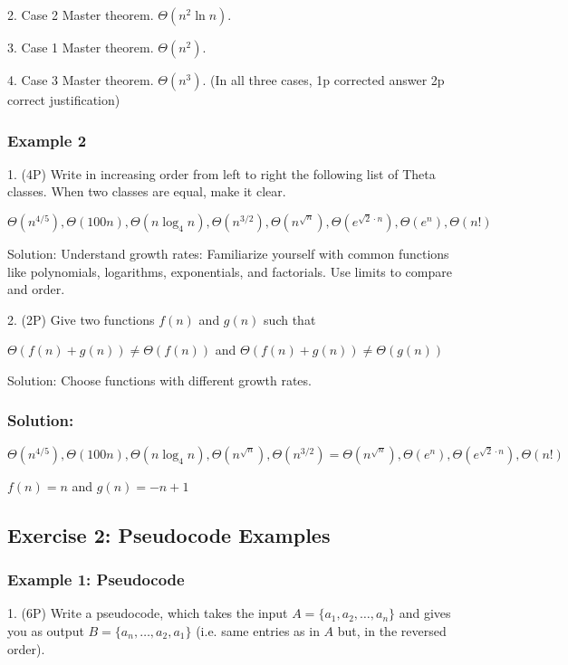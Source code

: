 2. Case 2 Master theorem. \(\Theta(n^2 \ln n)\).

3. Case 1 Master theorem. \(\Theta(n^2)\).

4. Case 3 Master theorem. \(\Theta(n^3)\). (In all three cases, 1p corrected answer 2p correct justification)

\subsubsection*{Example 2}
1. (4P) Write in increasing order from left to right the following list of Theta classes. When two classes are equal, make it clear.

\(\Theta(n^{4/5}), \Theta(100n), \Theta(n \log_4 n), \Theta(n^{3/2}), \Theta(n^{\sqrt{n}}), \Theta(e^{\sqrt{2} \cdot n}), \Theta(e^n), \Theta(n!)\)

Solution: Understand growth rates: Familiarize yourself with common functions like polynomials, logarithms, exponentials, and factorials. Use limits to compare and order.

2. (2P) Give two functions \(f(n)\) and \(g(n)\) such that

\(\Theta(f(n) + g(n)) \neq \Theta(f(n))\) and \(\Theta(f(n) + g(n)) \neq \Theta(g(n))\)

Solution: Choose functions with different growth rates.

\subsubsection*{Solution:}
\(\Theta(n^{4/5}), \Theta(100n), \Theta(n \log_4 n), \Theta(n^{\sqrt{n}}), \Theta(n^{3/2}) = \Theta(n^{\sqrt{n}}), \Theta(e^n), \Theta(e^{\sqrt{2} \cdot n}), \Theta(n!)\)

\(f(n) = n\) and \(g(n) = -n + 1\)

\subsection*{Exercise 2: Pseudocode Examples}

\subsubsection*{Example 1: Pseudocode}

1. (6P) Write a pseudocode, which takes the input $A = \{a_1,a_2,\ldots,a_n\}$ and gives you as output $B = \{a_n,\ldots,a_2,a_1\}$ (i.e. same entries as in $A$ but, in the reversed order).

